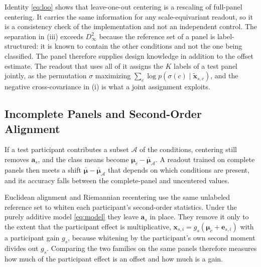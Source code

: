 Identity \eqref{eq:loo} shows that leave-one-out centering is a rescaling of full-panel centering. It carries the same information for any scale-equivariant readout, so it is a consistency check of the implementation and not an independent control. The separation in (iii) exceeds $D_\infty^2$ because the reference set of a panel is label-structured: it is known to contain the other conditions and not the one being classified. The panel therefore supplies design knowledge in addition to the offset estimate. The readout that uses all of it assigns the $K$ labels of a test panel jointly, as the permutation $\sigma$ maximizing $\sum_c\log p(\sigma(c)\mid\tilde{\mathbf{x}}_{s,c})$, and the negative cross-covariance in (i) is what a joint assignment exploits.

\subsection{Incomplete Panels and Second-Order Alignment}
If a test participant contributes a subset $\mathcal{A}$ of the conditions, centering still removes $\mathbf{a}_s$, and the class means become $\boldsymbol\mu_c-\bar{\boldsymbol\mu}_\mathcal{A}$. A readout trained on complete panels then meets a shift $\bar{\boldsymbol\mu}-\bar{\boldsymbol\mu}_\mathcal{A}$ that depends on which conditions are present, and its accuracy falls between the complete-panel and uncentered values.

Euclidean alignment \cite{he2020ea} and Riemannian recentering \cite{zanini2018transfer} use the same unlabeled reference set to whiten each participant's second-order statistics. Under the purely additive model \eqref{eq:model} they leave $\mathbf{a}_s$ in place. They remove it only to the extent that the participant effect is multiplicative, $\mathbf{x}_{s,i}=g_s(\boldsymbol\mu_c+\mathbf{e}_{s,i})$ with a participant gain $g_s$, because whitening by the participant's own second moment divides out $g_s$. Comparing the two families on the same panels therefore measures how much of the participant effect is an offset and how much is a gain.

